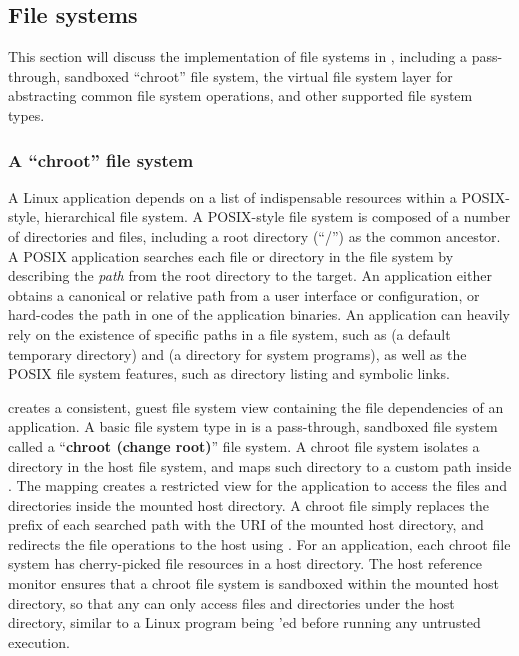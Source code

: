 \subsection{File systems}
\label{sec:libos:fs}

This section will discuss the implementation of file systems in \thelibos{}, including a pass-through, sandboxed ``chroot'' file system, the virtual file system layer for abstracting common file system operations, and other supported file system types.


\subsubsection{A ``chroot'' file system}


A Linux application depends on a list of indispensable resources
within a POSIX-style, hierarchical file system.
A POSIX-style file system is composed of a number of directories and files, including a root directory (``/'') as the common ancestor.
A POSIX application searches each file or directory in the file system
by describing the {\em path} %
from the root directory to the target. %
An application either obtains a canonical or relative path
from a user interface or configuration,
or hard-codes the path in one of the application binaries.
An application can heavily rely on the existence of specific paths in a file system,
such as  (a default temporary directory)
and  (a directory for system programs),
as well as the POSIX file system features,
such as directory listing and symbolic links.



\thelibos{} creates a consistent, guest file system view containing the file dependencies of an application.
A basic file system type in \thelibos{} is a pass-through, sandboxed file system called a ``{\bf chroot (change root)}'' file system.
A chroot file system isolates a directory in the host file system,
and maps such directory
to a custom path inside \thelibos{}.
The mapping creates a restricted view for the application to access the files and directories inside the mounted host directory.
A chroot file simply replaces the prefix of each searched path
with the URI of the mounted host directory,
and redirects the file operations to the host using \thehostabi{}.
For an application, each chroot file system has cherry-picked
file resources in a host directory.
The host reference monitor ensures that
a chroot file system 
is sandboxed within the mounted host directory,
so that any \hostapis{} can only access files and directories under the host directory,
similar to a Linux program being 'ed
before running any untrusted execution.


